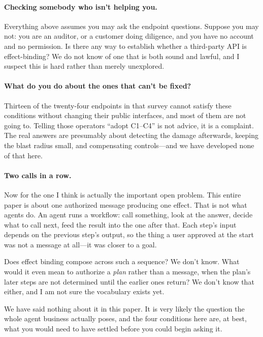 \documentclass[11pt]{article}
\begin{document}
\paragraph{Checking somebody who isn't helping you.}
Everything above assumes you may ask the endpoint questions. Suppose you may
not: you are an auditor, or a customer doing diligence, and you have no
account and no permission. Is there any way to establish whether a third-party
API is effect-binding? We do not know of one that is both sound and lawful,
and I suspect this is hard rather than merely unexplored.

\paragraph{What do you do about the ones that can't be fixed?}
Thirteen of the twenty-four endpoints in that survey cannot satisfy these
conditions without changing their public interfaces, and most of them are not
going to. Telling those operators ``adopt C1--C4'' is not advice, it is a
complaint. The real answers are presumably about detecting the damage
afterwards, keeping the blast radius small, and compensating controls---and we
have developed none of that here.

\paragraph{Two calls in a row.}
Now for the one I think is actually the important open problem. This entire
paper is about one authorized message producing one effect. That is not what
agents do. An agent runs a workflow: call something, look at the answer,
decide what to call next, feed the result into the one after that. Each step's
input depends on the previous step's output, so the thing a user approved at
the start was not a message at all---it was closer to a goal.

Does effect binding compose across such a sequence? We don't know. What would
it even mean to authorize a \emph{plan} rather than a message, when the plan's
later steps are not determined until the earlier ones return? We don't know
that either, and I am not sure the vocabulary exists yet.

We have said nothing about it in this paper. It is very likely the question
the whole agent business actually poses, and the four conditions here are, at
best, what you would need to have settled before you could begin asking it.



\end{document}
